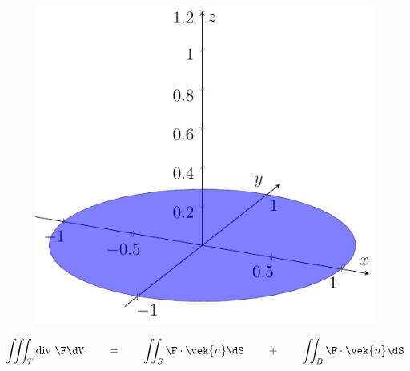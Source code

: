 \begin{frame}
\begin{figure}[ht]
\begin{minipage}[b]{0.30\linewidth}
        \end{minipage}
        \hspace{0.30cm}
        \begin{minipage}[b]{0.30\linewidth}
            \centering
            \includegraphics[width=\textwidth]{../img/2-Bunn.pdf}
        \end{minipage}
    \end{figure}
\begin{align*}
    \iiint_{T} \text{div }\F \dV
    \qquad =  \qquad 
    \iint_{S} \F \cdot \vek{n} \dS
    \qquad + \qquad  
    \iint_{B} \F \cdot \vek{n} \dS
\end{align*}
\end{frame}

